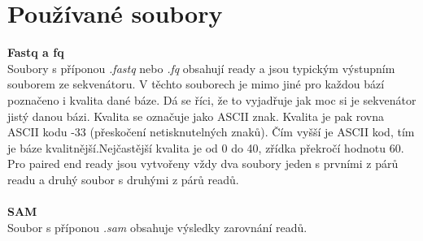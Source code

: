 \documentclass[czech,DP]{thesiskiv}
\numberwithin{equation}{section}
\begin{document}
\section{Používané soubory}

\textbf{Fastq a fq}
\\
\noindent
Soubory s příponou \textit{.fastq} nebo \textit{.fq} obsahují ready a jsou typickým výstupním souborem ze sekvenátoru. V těchto souborech je mimo jiné pro každou bází poznačeno i kvalita dané báze. Dá se říci, že to vyjadřuje jak moc si je sekvenátor jistý danou bázi. Kvalita se označuje jako ASCII znak. Kvalita je pak rovna ASCII kodu -33 (přeskočení netisknutelných znaků). Čím vyšší je ASCII kod, tím je báze kvalitnější.Nejčastější kvalita je od 0 do 40, zřídka překročí hodnotu 60. Pro paired end ready jsou vytvořeny vždy dva soubory jeden s prvními z párů readu a druhý soubor s druhými z párů readů. 
\\
\\
\textbf{SAM}	   
\\
\noindent 
Soubor s příponou \textit{.sam} obsahuje výsledky zarovnání readů.
\end{document}
